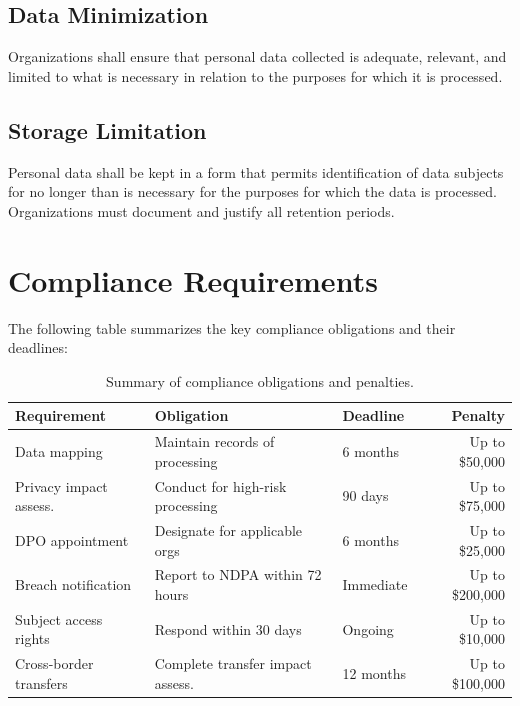 \documentclass[
    language=english,
    doctype=article,
    institution=none,
]{../../omnilatex}
\begin{document}
\subsection{Data Minimization}

Organizations shall ensure that personal data collected is adequate,
relevant, and limited to what is necessary in relation to the purposes for
which it is processed.

\subsection{Storage Limitation}

Personal data shall be kept in a form that permits identification of data
subjects for no longer than is necessary for the purposes for which the
data is processed. Organizations must document and justify all retention
periods.

\section{Compliance Requirements}

The following table summarizes the key compliance obligations and their
deadlines:

\begin{table}[h]
    \centering
    \begin{tabular}{lllr}
        \toprule
        \textbf{Requirement} & \textbf{Obligation} & \textbf{Deadline} & \textbf{Penalty} \\
        \midrule
        Data mapping           & Maintain records of processing    & 6 months  & Up to \$50,000 \\
        Privacy impact assess. & Conduct for high-risk processing  & 90 days   & Up to \$75,000 \\
        DPO appointment        & Designate for applicable orgs     & 6 months  & Up to \$25,000 \\
        Breach notification    & Report to NDPA within 72 hours    & Immediate & Up to \$200,000 \\
        Subject access rights  & Respond within 30 days            & Ongoing   & Up to \$10,000 \\
        Cross-border transfers & Complete transfer impact assess.  & 12 months & Up to \$100,000 \\
        \bottomrule
    \end{tabular}
    \caption{Summary of compliance obligations and penalties.}
\end{table}
\end{document}
